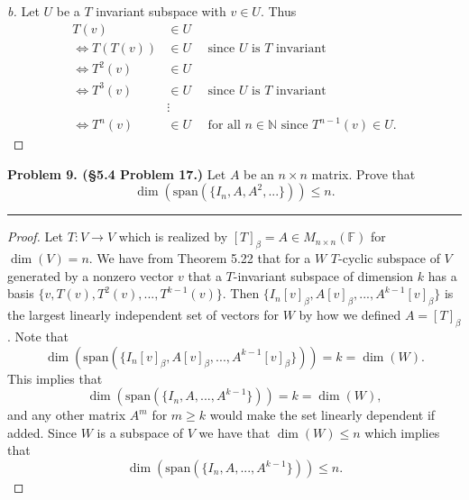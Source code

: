 \documentclass[leqno]{article}
\theoremstyle{nonumberplain}
\newtheorem{proof}{Proof}
\begin{document}
\begin{proof}[b]
Let $U$ be a $T$ invariant subspace with $v\in U$.  Thus
\begin{align*}
T(v)&\in U\\
\iff T(T(v))&\in U \textrm{~~~ since $U$ is $T$ invariant}\\
\iff T^2(v)&\in U\\
\iff T^3(v)&\in U \textrm{~~~ since $U$ is $T$ invariant}\\
&\vdots\\
\iff T^n(v)&\in U \textrm{~~~ for all $n\in \mathbb{N}$ since $T^{n-1}(v)\in U$.}
\end{align*}
\end{proof}

\pagebreak



\noindent\textbf{Problem 9. (\S 5.4 Problem 17.)} Let $A$ be an $n\times n$ matrix. Prove that
\[
\dim(\mathrm{span}(\{I_n,A,A^2,...\}))\leq n.
\]

\noindent\rule[0.5ex]{\linewidth}{1pt}

\begin{proof}
Let $T \colon V \to V$ which is realized by $[T]_\beta = A\in M_{n\times n}(\mathbb{F})$ for $\dim(V)=n$. We have from Theorem 5.22 that for a $W$ $T$-cyclic subspace of $V$ generated by a nonzero vector $v$ that a $T$-invariant subspace of dimension $k$ has a basis $\{v, T(v),T^2(v),...,T^{k-1}(v)\}$.   Then $\{I_n [v]_\beta, A[v]_\beta,...,A^{k-1}[v]_\beta\}$ is the largest linearly independent set of vectors for $W$ by how we defined $A=[T]_\beta$.  Note that \[\dim(\mathrm{span}(\{I_n [v]_\beta, A[v]_\beta,...,A^{k-1}[v]_\beta\}))=k=\dim(W).\]  This implies that \[\dim(\mathrm{span}(\{I_n, A,...,A^{k-1}\}))=k=\dim(W),\] and any other matrix $A^m$ for $m\geq k$ would make the set linearly dependent if added.  Since $W$ is a subspace of $V$ we have that $\dim(W)\leq n$ which implies that \[\dim(\mathrm{span}(\{I_n, A,...,A^{k-1}\}))\leq n.\]
\end{proof}


\pagebreak



\end{document}
